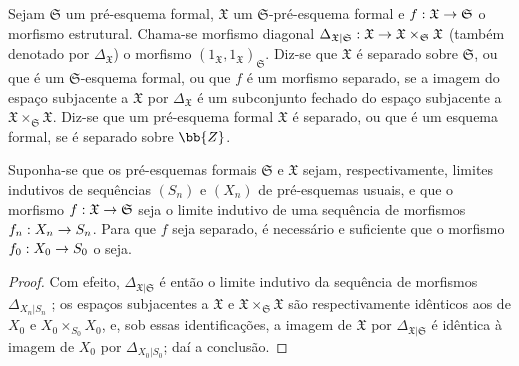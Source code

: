 \documentclass[oneside]{amsart}
\makeatletter
\newcommand{\ega@arrow}[2]{\mathchoice{#1}{#2}{#2}{#2}}
\renewcommand{\to}{\ega@arrow{\longrightarrow}{\rightarrow}}
\let\EGAOriginalLabel\label
\renewcommand{\label}[1]{\phantomsection\EGAOriginalLabel{#1}}
\makeatother
\begin{document}
\begin{definition}[10.15.1]
\label{I.10.15.1}
Sejam $\mathfrak{S}$ um pré-esquema formal, $\mathfrak{X}$ um $\mathfrak{S}$-pré-esquema formal e $f:\mathfrak{X}\to\mathfrak{S}$ o morfismo estrutural.
Chama-se morfismo diagonal $\Delta_{\mathfrak{X}|\mathfrak{S}}:\mathfrak{X}\to\mathfrak{X}\times_\mathfrak{S}\mathfrak{X}$ (também denotado por $\Delta_\mathfrak{X}$) o morfismo $(1_\mathfrak{X},1_\mathfrak{X})_\mathfrak{S}$.
Diz-se que $\mathfrak{X}$ é separado sobre $\mathfrak{S}$, ou que é um $\mathfrak{S}$-esquema formal, ou que $f$ é um morfismo separado, se a imagem do espaço subjacente a $\mathfrak{X}$ por $\Delta_\mathfrak{X}$ é um subconjunto fechado do espaço subjacente a $\mathfrak{X}\times_\mathfrak{S}\mathfrak{X}$.
Diz-se que um pré-esquema formal $\mathfrak{X}$ é separado, ou que é um esquema formal, se é separado sobre $\bb{Z}$.
\end{definition}

\begin{proposition}[10.15.2]
\label{I.10.15.2}
Suponha-se que os pré-esquemas formais $\mathfrak{S}$ e $\mathfrak{X}$ sejam, respectivamente, limites indutivos de sequências $(S_n)$ e $(X_n)$ de pré-esquemas usuais, e que o morfismo $f:\mathfrak{X}\to\mathfrak{S}$ seja o limite indutivo de uma sequência de morfismos $f_n:X_n\to S_n$.
Para que $f$ seja separado, é necessário e suficiente que o morfismo $f_0:X_0\to S_0$ o seja.
\end{proposition}

\begin{proof}
Com efeito, $\Delta_{\mathfrak{X}|\mathfrak{S}}$ é então o limite indutivo da sequência de morfismos $\Delta_{X_n|S_n}$ ; os espaços subjacentes a $\mathfrak{X}$ e $\mathfrak{X}\times_\mathfrak{S}\mathfrak{X}$ são respectivamente idênticos aos de $X_0$ e $X_0\times_{S_0}X_0$, e, sob essas identificações, a imagem de $\mathfrak{X}$ por $\Delta_{\mathfrak{X}|\mathfrak{S}}$ é idêntica à imagem de $X_0$ por $\Delta_{X_0|S_0}$;
daí a conclusão.
\end{proof}
\end{document}
